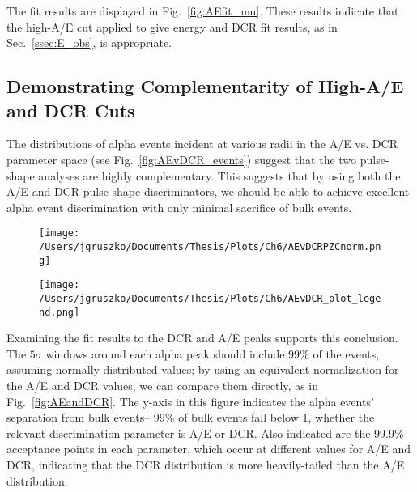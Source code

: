 The fit results are displayed in Fig.~\ref{fig:AEfit_mu}. These results indicate that the high-A/E cut applied to give energy and DCR fit results,  as in Sec.~\ref{ssec:E_obs}, is appropriate.


\subsection{Demonstrating Complementarity of High-A/E and DCR Cuts}
The distributions of alpha events incident at various radii in the A/E vs. DCR parameter space (see Fig.~\ref{fig:AEvDCR_events}) suggest that the two pulse-shape analyses are highly complementary. This suggests that by using both the A/E and DCR pulse shape discriminators, we should be able to achieve excellent alpha event discrimination with only minimal sacrifice of bulk events. 

\begin{figure*}[]
 \centering
 \begin{subfigure}{.65\textwidth}
 \texttt{[image: /Users/jgruszko/Documents/Thesis/Plots/Ch6/AEvDCRPZCnorm.png]}
 \end{subfigure}
 \begin{subfigure}{.34\textwidth}
  \texttt{[image: /Users/jgruszko/Documents/Thesis/Plots/Ch6/AEvDCR\_plot\_legend.png]}
   \end{subfigure}
 \caption[The A/E vs. normalized DCR distribution at various scanning radii]{The A/E vs. normalized DCR distribution for all single-site events with energies between 100\,keV and 10\,MeV, at various scanning radii. The points in black are from a data set without the alpha source incident on the detector surface, and the scan data sets are shown in rainbow order, with red representing the smallest-radius scan. 99\% of calibration events with energies between 1000 and 2630\,keV fall below an A/E value of 1, and 99\% of calibration events with energies between 1000 and 2380\,keV fall below a {\tt dcrpzc99norm} value of 1.} 
 \label{fig:AEvDCR_events}
\end{figure*}

Examining the fit results to the DCR and A/E peaks supports this conclusion. The $5\sigma$ windows around each alpha peak should include 99\% of the events, assuming normally distributed values; by using an equivalent normalization for the A/E and DCR values, we can compare them directly, as in Fig.~\ref{fig:AEandDCR}. The y-axis in this figure indicates the alpha events' separation from bulk events-- 99\% of bulk events fall below 1, whether the relevant discrimination parameter is A/E or DCR. Also indicated are the 99.9\% acceptance points in each parameter, which occur at different values for A/E and DCR, indicating that the DCR distribution is more heavily-tailed than the A/E distribution. 

